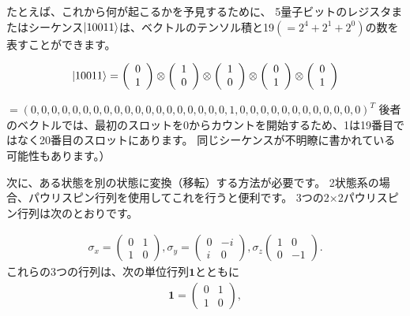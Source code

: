 たとえば、これから何が起こるかを予見するために、
5量子ビットのレジスタまたはシーケンス$\ket{10011}$は、ベクトルのテンソル積と19$(= 2^4 + 2^1 + 2^0)$の数を表すことができます。

\begin{eqnarray}
\label{10}
\ket{10011} = 
\left( \begin{array}{ccc}
 0 \\
 1 
\end{array} \right) 
\otimes
\left( \begin{array}{ccc}
 1 \\
 0 
\end{array} \right)
\otimes
\left( \begin{array}{ccc}
 1 \\
 0 
\end{array} \right)
\otimes
\left( \begin{array}{ccc}
 0 \\
 1 
\end{array} \right)
\otimes
\left( \begin{array}{ccc}
 0 \\
 1 
\end{array} \right)
\end{eqnarray}

$= (0,0,0,0,0,0,0,0,0,0,0,0,0,0,0,0,0,0,0,1,0,0,0,0,0,0,0,0,0,0,0,0)^T$
後者のベクトルでは、最初のスロットを0からカウントを開始するため、1は19番目ではなく20番目のスロットにあります。 同じシーケンスが不明瞭に書かれている可能性もあります。）

次に、ある状態を別の状態に変換（移転）する方法が必要です。 2状態系の場合、パウリスピン行列を使用してこれを行うと便利です。 3つの2×2パウリスピン行列は次のとおりです。

\begin{eqnarray}
\label{11}
\sigma_x = 
\left( \begin{array}{ccc}
 0 & 1 \\
 1 & 0
\end{array} \right) 
,
\sigma_y = 
\left( \begin{array}{ccc}
 0 & -i \\
 i & 0
\end{array} \right)
,
\sigma_z
\left( \begin{array}{ccc}
 1 & 0\\
 0 & -1
\end{array} \right)
.
\end{eqnarray}
これらの3つの行列は、次の単位行列$\mathbf{1}$とともに
\begin{eqnarray}
\label{12}
\mathbf{1} = 
\left( \begin{array}{ccc}
 0 & 1 \\
 1 & 0
\end{array} \right) 
,
\end{eqnarray}

